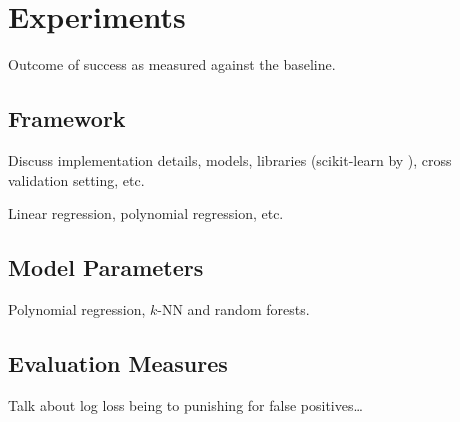 \section{Experiments}
\label{sec:three}

Outcome of success as measured against the baseline.

\subsection{Framework}

Discuss implementation details, models, libraries (scikit-learn by
\citet{sklearn:2011}), cross validation setting, etc.

Linear regression, polynomial regression, etc.

\subsection{Model Parameters}

Polynomial regression, $k$-NN and random forests.

\subsection{Evaluation Measures}

Talk about log loss being to punishing for false positives\ldots

